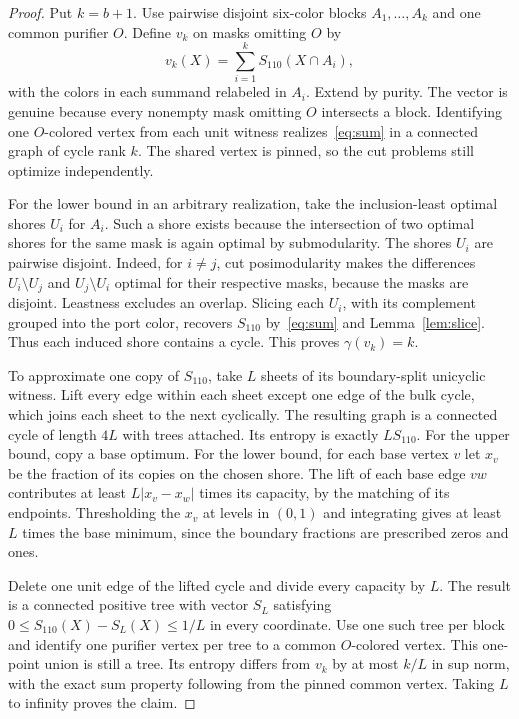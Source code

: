 \documentclass[11pt]{article}
\newcommand{\ray}{S_{110}}
\begin{document}
\begin{proof}
Put \(k=b+1\). Use pairwise disjoint six-color blocks \(A_1,\ldots,A_k\)
and one common purifier \(O\). Define \(v_k\) on masks omitting \(O\)
by
\begin{equation}
 v_k(X)=\sum_{i=1}^k \ray(X\cap A_i),
 \label{eq:sum}
\end{equation}
with the colors in each summand relabeled in \(A_i\). Extend by purity.
The vector is genuine because every nonempty mask omitting \(O\)
intersects a block. Identifying one \(O\)-colored vertex from each
unit witness realizes~\eqref{eq:sum} in a connected graph of cycle
rank \(k\). The shared vertex is pinned, so the cut problems still
optimize independently.

For the lower bound in an arbitrary realization, take the
inclusion-least optimal shores \(U_i\) for \(A_i\). Such a shore exists
because the intersection of two optimal shores for the same mask is
again optimal by submodularity. The shores \(U_i\) are pairwise
disjoint. Indeed, for \(i\ne j\), cut posimodularity makes the
differences \(U_i\setminus U_j\) and \(U_j\setminus U_i\) optimal for
their respective masks, because the masks are disjoint. Leastness
excludes an overlap. Slicing each \(U_i\), with its complement grouped
into the port color, recovers \(\ray\) by~\eqref{eq:sum} and
Lemma~\ref{lem:slice}. Thus each induced shore contains a cycle.
This proves \(\gamma(v_k)=k\).

To approximate one copy of \(\ray\), take \(L\) sheets of its
boundary-split unicyclic witness. Lift every edge within each sheet
except one edge of the bulk cycle, which joins each sheet to the next
cyclically. The resulting graph is a connected cycle of length \(4L\)
with trees attached. Its entropy is exactly \(L\ray\).
For the upper bound, copy a base optimum. For the lower bound, for
each base vertex \(v\) let \(x_v\) be the fraction of its copies on
the chosen shore. The lift of each base edge \(vw\) contributes at
least \(L|x_v-x_w|\) times its capacity, by the matching of its
endpoints. Thresholding the \(x_v\) at levels in \((0,1)\) and
integrating gives at least \(L\) times the base minimum, since the
boundary fractions are prescribed zeros and ones.

Delete one unit edge of the lifted cycle and divide every capacity by
\(L\). The result is a connected positive tree with vector \(S_L\)
satisfying \(0\leq\ray(X)-S_L(X)\leq1/L\) in every coordinate.
Use one such tree per block and identify one purifier vertex per tree
to a common \(O\)-colored vertex. This one-point union is still a tree.
Its entropy differs from \(v_k\) by at most \(k/L\) in sup norm, with
the exact sum property following from the pinned common vertex.
Taking \(L\) to infinity proves the claim.
\end{proof}
\end{document}
